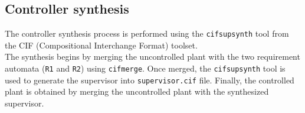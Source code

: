 \subsection*{Controller synthesis}
The controller synthesis process is performed using the \texttt{cifsupsynth} tool from the CIF (Compositional Interchange Format) toolset.\\[2ex]
The synthesis begins by merging the uncontrolled plant with the two requirement automata (\texttt{R1} and \texttt{R2}) using \texttt{cifmerge}. Once merged, the \texttt{cifsupsynth} tool is used to generate the supervisor into \texttt{supervisor.cif} file. Finally, the controlled plant is obtained by merging the uncontrolled plant with the synthesized supervisor.